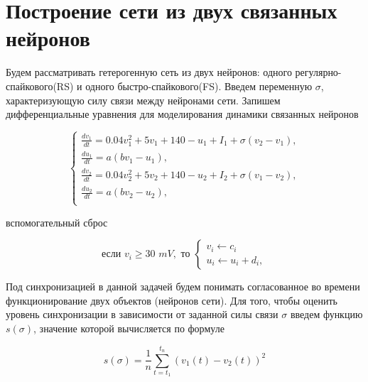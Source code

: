 \chapter{Построение сети из двух связанных нейронов}
\label{ch:chap7}

Будем рассматривать гетерогенную сеть из двух нейронов: одного регулярно-спайкового(RS) и одного быстро-спайкового(FS). Введем переменную $\sigma$, характеризующую силу связи между нейронами сети. Запишем дифференциальные уравнения для моделирования динамики связанных нейронов

\begin{equation}
	\begin{cases}
			\frac{dv_1}{dt} = 0.04v_1^2+5v_1+140-u_1+I_1 + \sigma(v_2 - v_1),\\
			\frac{du_1}{dt} = a(bv_1-u_1),\\
			\frac{dv_2}{dt} = 0.04v_2^2+5v_2+140-u_2+I_2 + \sigma(v_1 - v_2),\\
			\frac{du_2}{dt} = a(bv_2-u_2),\\
	\end{cases}
\end{equation}

вспомогательный сброс

\begin{equation}
	\text{если } v_i \geq 30 \, \, mV , \text{ то } \begin{cases}
		v_i \leftarrow c_i\\
		u_i \leftarrow u_i+d_i,
	\end{cases}
\end{equation}

Под синхронизацией в данной задачей будем понимать согласованное во времени функционирование двух объектов (нейронов сети)\cite{sem}. Для того, чтобы оценить уровень синхронизации в зависимости от заданной силы связи $\sigma$ введем функцию $s(\sigma)$, значение которой вычисляется по формуле

\begin{equation}
	s(\sigma) = \frac{1}{n} \sum \limits_{t = t_1}^{t_n} (v_1(t) - v_2(t))^2
\end{equation}

\endinput